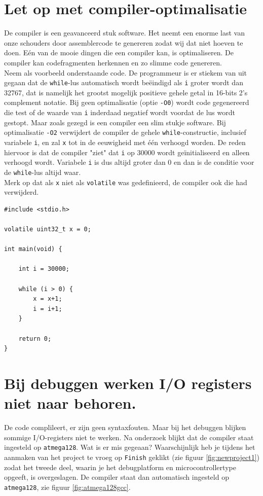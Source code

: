 \documentclass[12pt,a4paper,final,oneside,fleqn]{article}
\begin{document}
\section{Let op met compiler-optimalisatie}
\label{sec:compopt}
De compiler is een geavanceerd stuk software. Het neemt een enorme last van onze schouders
door assemblercode te genereren zodat wij dat niet hoeven te doen. E\'{e}n van de mooie
dingen die een compiler kan, is optimaliseren. De compiler kan codefragmenten herkennen
en zo slimme code genereren. \\
Neem als voorbeeld onderstaande code. De programmeur is er stiekem van uit gegaan dat
de \texttt{while}-lus automatisch wordt be\"{e}indigd als \texttt{i} groter wordt dan
32767, dat is namelijk het grootst mogelijk positieve gehele getal in 16-bits
2's complement notatie. Bij geen optimalisatie (optie \texttt{-O0}) wordt code
gegenereerd die test of de waarde van \texttt{i} inderdaad negatief wordt voordat
de lus wordt gestopt. Maar zoals gezegd is een compiler een slim stukje software.
Bij optimalisatie \texttt{-O2} verwijdert de compiler de gehele \texttt{while}-constructie,
inclusief variabele \texttt{i}, en zal \texttt{x} tot in de eeuwigheid met \'{e}\'{e}n
verhoogd worden. De reden hiervoor is dat de compiler "ziet" dat \texttt{i} op 30000
wordt ge\"{i}nitialiseerd en alleen verhoogd wordt. Variabele \texttt{i} is dus altijd
groter dan 0 en dan is de conditie voor de \texttt{while}-lus altijd waar. \\
Merk op dat als \texttt{x} niet als \texttt{volatile} was gedefinieerd, de compiler
ook die had verwijderd.

\begin{lstlisting}[style=numbers,caption=Code met impliciet testen]
#include <stdio.h>

volatile uint32_t x = 0;

int main(void) {

    int i = 30000;

    while (i > 0) {
		x = x+1;
		i = i+1;
    }
    
    return 0;
}
\end{lstlisting}

\section{Bij debuggen werken I/O registers niet naar behoren.}
De code complileert, er zijn geen syntaxfouten. Maar bij het debuggen blijken
sommige I/O-registers niet te werken. Na onderzoek blijkt dat de compiler staat
ingesteld op \texttt{atmega128}. Wat is er mis gegeaan? Waarschijnlijk heb je
tijdens het aanmaken van het project te vroeg op \texttt{Finish} geklikt
(zie figuur \ref{fig:newproject1}) zodat het tweede deel, waarin je het
debugplatform en microcontrollertype opgeeft, is overgeslagen. De compiler
staat dan automatisch ingesteld op \texttt{atmega128}, zie figuur
\ref{fig:atmega128gcc}.
\end{document}
